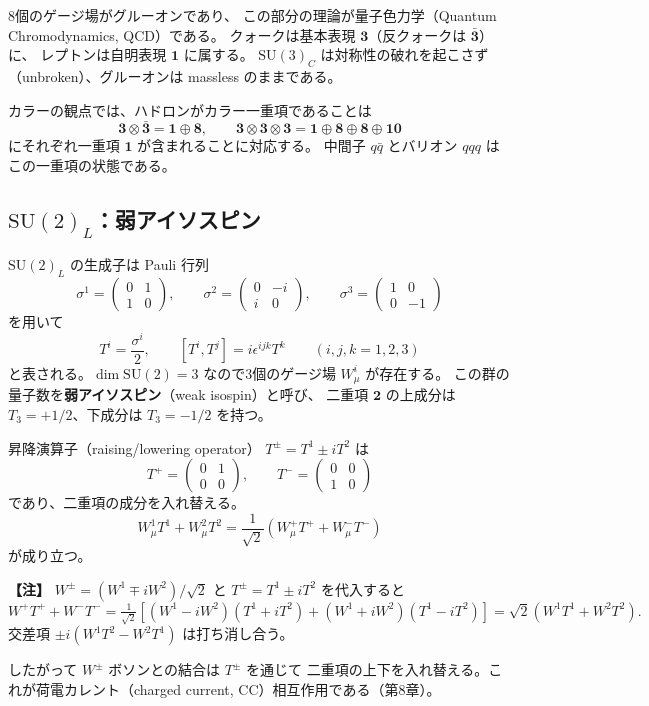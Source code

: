 \documentclass[uplatex,dvipdfmx,a4paper,11pt,openany]{jsbook}
\newcommand{\term}[2]{\textbf{#1}（#2）}
\newcommand{\en}[1]{（#1）}
\newenvironment{note}{\vspace{1ex}\par\footnotesize\noindent\textbf{【注】}}{\par\vspace{1ex}}
\numberwithin{equation}{chapter}
\theoremstyle{definition}
\theoremstyle{plain}
\theoremstyle{remark}
\newcommand{\SU}{\mathrm{SU}}
\begin{document}
8個のゲージ場がグルーオンであり、
この部分の理論が量子色力学（Quantum Chromodynamics, QCD）である。
クォークは基本表現 $\mathbf{3}$（反クォークは $\bar{\mathbf{3}}$）に、
レプトンは自明表現 $\mathbf{1}$ に属する。
$\SU(3)_C$ は対称性の破れを起こさず\en{unbroken}、グルーオンは massless のままである。

カラーの観点では、ハドロンがカラー一重項であることは
\begin{equation}
\mathbf{3}\otimes\bar{\mathbf{3}}=\mathbf{1}\oplus\mathbf{8},
\qquad
\mathbf{3}\otimes\mathbf{3}\otimes\mathbf{3}=\mathbf{1}\oplus\mathbf{8}\oplus\mathbf{8}\oplus\mathbf{10}
\end{equation}
にそれぞれ一重項 $\mathbf{1}$ が含まれることに対応する。
中間子 $q\bar q$ とバリオン $qqq$ はこの一重項の状態である。
\subsection{$\SU(2)_L$：弱アイソスピン}
$\SU(2)_L$ の生成子は Pauli 行列
\begin{equation}
\sigma^1=\begin{pmatrix}0&1\\1&0\end{pmatrix},\qquad
\sigma^2=\begin{pmatrix}0&-i\\i&0\end{pmatrix},\qquad
\sigma^3=\begin{pmatrix}1&0\\0&-1\end{pmatrix}
\end{equation}
を用いて
\begin{equation}
T^i=\frac{\sigma^i}{2},
\qquad
[T^i,T^j]=i\epsilon^{ijk}T^k
\qquad(i,j,k=1,2,3)
\end{equation}
と表される。$\dim\SU(2)=3$ なので3個のゲージ場 $W_\mu^i$ が存在する。
この群の量子数を\term{弱アイソスピン}{weak isospin}と呼び、
二重項 $\mathbf{2}$ の上成分は $T_3=+1/2$、下成分は $T_3=-1/2$ を持つ。

昇降演算子\en{raising/lowering operator} $T^\pm=T^1\pm iT^2$ は
\begin{equation}
T^+=\begin{pmatrix}0&1\\0&0\end{pmatrix},\qquad
T^-=\begin{pmatrix}0&0\\1&0\end{pmatrix}
\end{equation}
であり、二重項の成分を入れ替える。
\begin{equation}
W_\mu^1T^1+W_\mu^2T^2
=\frac{1}{\sqrt2}\left(W_\mu^+T^++W_\mu^-T^-\right)
\end{equation}
が成り立つ。
\begin{note}
$W^\pm=(W^1\mp iW^2)/\sqrt2$ と $T^\pm=T^1\pm iT^2$ を代入すると
\[
W^+T^++W^-T^-
=\tfrac{1}{\sqrt2}\left[(W^1-iW^2)(T^1+iT^2)+(W^1+iW^2)(T^1-iT^2)\right]
=\sqrt2\left(W^1T^1+W^2T^2\right).
\]
交差項 $\pm i(W^1T^2-W^2T^1)$ は打ち消し合う。
\end{note}
したがって $W^\pm$ ボソンとの結合は $T^\pm$ を通じて
二重項の上下を入れ替える。これが荷電カレント\en{charged current, CC}相互作用である（第8章）。
\end{document}
